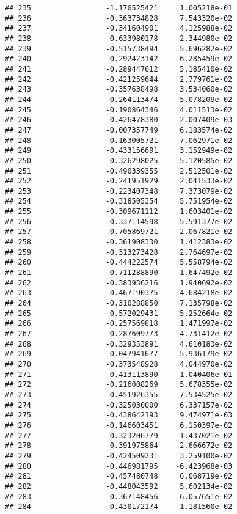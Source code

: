 \documentclass[
]{article}
\begin{document}
\begin{verbatim}
## 235                 -1.170525421     1.005218e-01
## 236                 -0.363734828     7.543320e-02
## 237                 -0.341604901     4.125988e-02
## 238                 -0.633980178     2.344980e-02
## 239                 -0.515738494     5.696282e-02
## 240                 -0.292423142     6.285459e-02
## 241                 -0.289447612     5.185410e-02
## 242                 -0.421259644     2.779761e-02
## 243                 -0.357638498     3.534060e-02
## 244                 -0.264113474    -5.078209e-02
## 245                 -0.190864346     4.011513e-02
## 246                 -0.426478380     2.007409e-03
## 247                 -0.007357749     6.183574e-02
## 248                 -0.163005721     7.062971e-02
## 249                 -0.433156691     3.152949e-02
## 250                 -0.326298025     5.120585e-02
## 251                 -0.490339355     2.512501e-02
## 252                 -0.241951929     2.041533e-02
## 253                 -0.223407348     7.373079e-02
## 254                 -0.318505354     5.751954e-02
## 255                 -0.309671112     1.603401e-02
## 256                 -0.337114598     5.591377e-02
## 257                 -0.705869721     2.067821e-02
## 258                 -0.361908330     1.412383e-02
## 259                 -0.313273428     2.764697e-02
## 260                 -0.444222574     5.558794e-02
## 261                 -0.711288890     1.647492e-02
## 262                 -0.383936216     1.940692e-02
## 263                 -0.467190375     4.684218e-02
## 264                 -0.310288850     7.135798e-02
## 265                 -0.572029431     5.252664e-02
## 266                 -0.257569818     1.471997e-02
## 267                 -0.287609773     4.731412e-02
## 268                 -0.329353891     4.610183e-02
## 269                  0.047941677     5.936179e-02
## 270                 -0.373548928     4.044970e-02
## 271                 -0.413113890     1.040406e-01
## 272                 -0.216008269     5.678355e-02
## 273                 -0.451926355     7.534525e-02
## 274                 -0.325030000     6.337157e-02
## 275                 -0.438642193     9.474971e-03
## 276                 -0.146603451     6.150397e-02
## 277                 -0.323206779    -1.437021e-02
## 278                 -0.391975864     2.666672e-02
## 279                 -0.424509231     3.259100e-02
## 280                 -0.446981795    -6.423968e-03
## 281                 -0.457480748     6.068719e-02
## 282                 -0.448043592     5.602134e-02
## 283                 -0.367148456     6.057651e-02
## 284                 -0.430172174     1.181560e-02

\end{verbatim}
\end{document}
